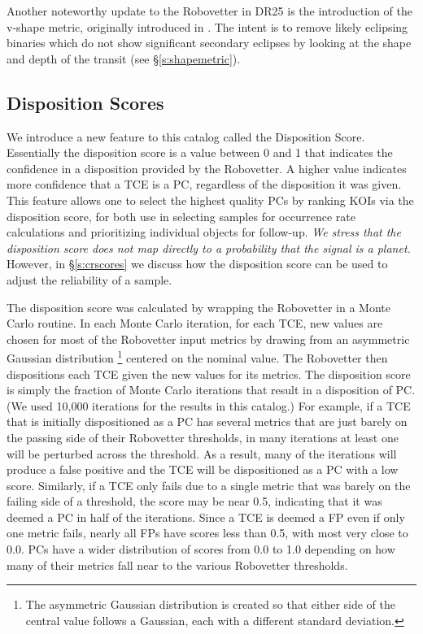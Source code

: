 Another noteworthy update to the Robovetter in DR25 is the introduction of the v-shape metric, originally introduced in \citet{Batalha2013}.  The intent is to remove likely eclipsing binaries which do not show significant secondary eclipses by looking at the shape and depth of the transit (see \S\ref{s:shapemetric}).




\subsection{Disposition Scores}
\label{s:scores}
We introduce a new feature to this catalog called the Disposition Score. Essentially the disposition score is a value between 0 and 1 that indicates the confidence in a disposition provided by the Robovetter. A higher value indicates more confidence that a TCE is a PC, regardless of the disposition it was given. This feature allows one to select the highest quality PCs by ranking KOIs via the disposition score, for both use in selecting samples for occurrence rate calculations and prioritizing individual objects for follow-up. \emph{We stress that the disposition score does not map directly to a probability that the signal is a planet.} However, in \S\ref{s:crscores} we discuss how the disposition score can be used to adjust the reliability of a sample.

The disposition score was calculated by wrapping the Robovetter in a Monte Carlo routine. In each Monte Carlo iteration, for each TCE, new values are chosen for most of the Robovetter input metrics by drawing from an asymmetric Gaussian distribution \footnote{The asymmetric Gaussian distribution is created so that either side of the central value follows a Gaussian, each with a different standard deviation.} centered on the nominal value. The Robovetter then dispositions each TCE given the new values for its metrics. The disposition score is simply the fraction of Monte Carlo iterations that result in a disposition of PC. (We used 10,000 iterations for the results in this catalog.) For example, if a TCE that is initially dispositioned as a PC has several metrics that are just barely on the passing side of their Robovetter thresholds, in many iterations at least one will be perturbed across the threshold. As a result, many of the iterations will produce a false positive and the TCE will be dispositioned as a PC with a low score.  Similarly, if a TCE only fails due to a single metric that was barely on the failing side of a threshold, the score may be near 0.5, indicating that it was deemed a PC in half of the iterations.  Since a TCE is deemed a FP even if only one metric fails, nearly all FPs have scores less than 0.5, with most very close to 0.0.  PCs have a wider distribution of scores from 0.0 to 1.0 depending on how many of their metrics fall near to the various Robovetter thresholds.

